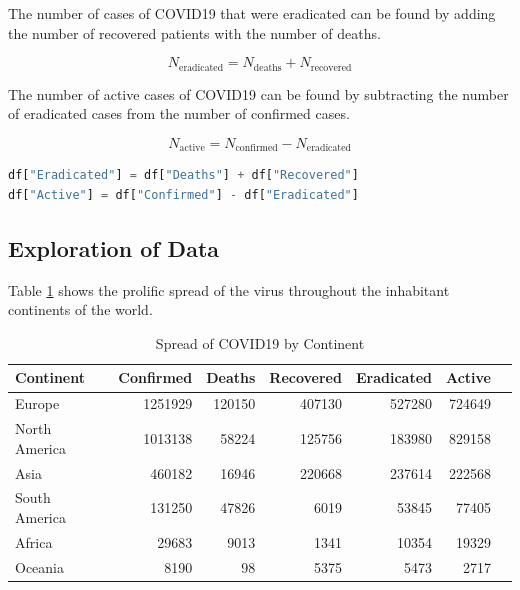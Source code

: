 \documentclass{homework}
\begin{document}
The number of cases of COVID19 that were eradicated can be found by adding the number of recovered patients with the number of deaths.

\begin{equation}
  N_{\text{eradicated}} = N_{\text{deaths}} + N_{\text{recovered}}
\end{equation}

The number of active cases of COVID19 can be found by subtracting the number of eradicated cases from the number of confirmed cases.

\begin{equation}
  N_{\text{active}} = N_{\text{confirmed}} - N_{\text{eradicated}}
\end{equation}

\begin{lstlisting}[language=Python, caption={Computed eradicated and active cases}]
df["Eradicated"] = df["Deaths"] + df["Recovered"]
df["Active"] = df["Confirmed"] - df["Eradicated"]
\end{lstlisting}

\newpage
\subsection{Exploration of Data}

Table \ref{Continent Spread} shows the prolific spread of the virus throughout the inhabitant continents of the world.

\begin{table}[h]
  \caption{Spread of COVID19 by Continent}
  \label{Continent Spread}
  \centering
  \begin{tabular}{lrrrrrr}
    \toprule
    Continent     & Confirmed & Deaths & Recovered & Eradicated & Active \\
    \midrule
    Europe        & 1251929   & 120150 & 407130    & 527280     & 724649 \\
    North America & 1013138   & 58224  & 125756    & 183980     & 829158 \\
    Asia          & 460182    & 16946  & 220668    & 237614     & 222568 \\
    South America & 131250    & 47826  & 6019      & 53845      & 77405  \\
    Africa        & 29683     & 9013   & 1341      & 10354      & 19329  \\
    Oceania       & 8190      & 98     & 5375      & 5473       & 2717   \\
    \bottomrule
  \end{tabular}
\end{table}
\end{document}
